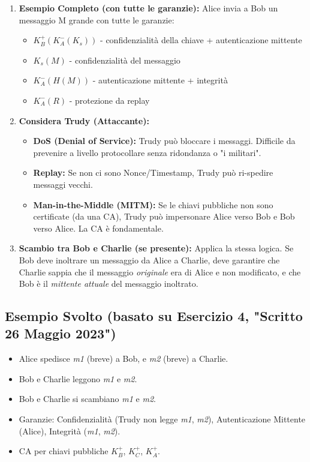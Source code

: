 \begin{enumerate}[label=\arabic*.]
    \item \textbf{Esempio Completo (con tutte le garanzie):}
    Alice invia a Bob un messaggio M grande con tutte le garanzie:
    \begin{itemize}
        \item $K_B^+(K_A^-(K_s))$ - confidenzialità della chiave + autenticazione mittente
        \item $K_s(M)$ - confidenzialità del messaggio
        \item $K_A^-(H(M))$ - autenticazione mittente + integrità
        \item $K_A^-(R)$ - protezione da replay
    \end{itemize}
    \item \textbf{Considera Trudy (Attaccante):}
    \begin{itemize}
        \item \textbf{DoS (Denial of Service):} Trudy può bloccare i messaggi. Difficile da prevenire a livello protocollare senza ridondanza o "i militari".
        \item \textbf{Replay:} Se non ci sono Nonce/Timestamp, Trudy può ri-spedire messaggi vecchi.
        \item \textbf{Man-in-the-Middle (MITM):} Se le chiavi pubbliche non sono certificate (da una CA), Trudy può impersonare Alice verso Bob e Bob verso Alice. La CA è fondamentale.
    \end{itemize}
    \item \textbf{Scambio tra Bob e Charlie (se presente):} Applica la stessa logica. Se Bob deve inoltrare un messaggio da Alice a Charlie, deve garantire che Charlie sappia che il messaggio \textit{originale} era di Alice e non modificato, e che Bob è il \textit{mittente attuale} del messaggio inoltrato.
\end{enumerate}

\subsection{Esempio Svolto (basato su Esercizio 4, "Scritto 26 Maggio 2023")}
\begin{itemize}
    \item Alice spedisce \textit{m1} (breve) a Bob, e \textit{m2} (breve) a Charlie.
    \item Bob e Charlie leggono \textit{m1} e \textit{m2}.
    \item Bob e Charlie si scambiano \textit{m1} e \textit{m2}.
    \item Garanzie: Confidenzialità (Trudy non legge \textit{m1}, \textit{m2}), Autenticazione Mittente (Alice), Integrità (\textit{m1}, \textit{m2}).
    \item CA per chiavi pubbliche $K_B^+$, $K_C^+$, $K_A^+$.
\end{itemize}

